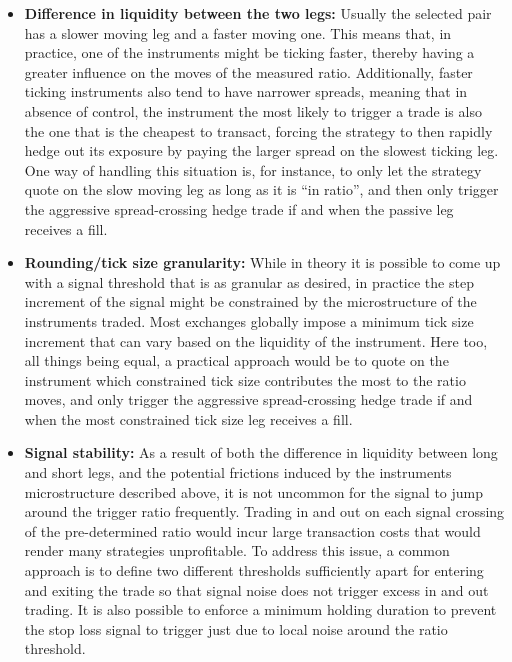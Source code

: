 \begin{itemize}
\item \textbf{Difference in liquidity between the two legs:} Usually the selected pair has a slower moving leg and a faster moving one. This means that, in practice, one of the instruments might be ticking faster, thereby having a greater influence on the moves of the measured ratio. Additionally, faster ticking instruments also tend to have narrower spreads, meaning that in absence of control, the instrument the most likely to trigger a trade is also the one that is the cheapest to transact, forcing the strategy to then rapidly hedge out its exposure by paying the larger spread on the slowest ticking leg. One way of handling this situation is, for instance, to only let the strategy quote on the slow moving leg as long as it is ``in ratio'', and then only trigger the aggressive spread-crossing hedge trade if and when the passive leg receives a fill. 

\item \textbf{Rounding/tick size granularity:} While in theory it is possible to come up with a signal threshold that is as granular as desired, in practice the step increment of the signal might be constrained by the microstructure of the instruments traded. Most exchanges globally impose a minimum tick size increment that can vary based on the liquidity of the instrument. Here too, all things being equal, a practical approach would be to quote on the instrument which constrained tick size contributes the most to the ratio moves, and only trigger the aggressive spread-crossing hedge trade if and when the most constrained tick size leg receives a fill. 

\item \textbf{Signal stability:} As a result of both the difference in liquidity between long and short legs, and the potential frictions induced by the instruments microstructure described above, it is not uncommon for the signal to jump around the trigger ratio frequently. Trading in and out on each signal crossing of the pre-determined ratio would incur large transaction costs that would render many strategies unprofitable. To address this issue, a common approach is to define two different thresholds sufficiently apart for entering and exiting the trade so that signal noise does not trigger excess in and out trading. It is also possible to enforce a minimum holding duration to prevent the stop loss signal to trigger just due to local noise around the ratio threshold. 


\end{itemize}
